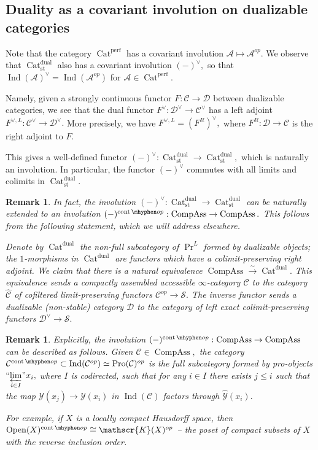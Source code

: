 \documentclass[11pt,leqno]{amsart}
\newtheorem{remark}[theo]{Remark}
\numberwithin{equation}{section}
\newcommand{\ms}[1]{\mathscr{#1}}
\newcommand{\msK}{\ms{K}}
\newcommand{\hy}{\mhyphen}
\newcommand{\prolim}[1][]{\mathop{\varprojlim}\limits_{#1}}
\newcommand{\proolim}[1][]{{``{\prolim[#1]}"}}
\newcommand{\xto}{\xrightarrow}
\newcommand{\Cat}{\operatorname{Cat}}
\newcommand{\cont}{\operatorname{cont}}
\newcommand{\st}{\operatorname{st}}
\newcommand{\dual}{\operatorname{dual}}
\newcommand{\cD}{{\mathcal D}}
\newcommand{\cA}{{\mathcal A}}
\newcommand{\cC}{{\mathcal C}}
\newcommand{\cY}{{\mathcal Y}}
\newcommand{\cS}{{\mathcal S}}
\newcommand{\Compass}{\operatorname{CompAss}}
\newcommand{\perf}{\operatorname{perf}}
\newcommand{\Ind}{\operatorname{Ind}}
\newcommand{\Pro}{\operatorname{Pro}}
\newcommand{\Open}{\operatorname{Open}}
\begin{document}
\subsection{Duality as a covariant involution on dualizable categories}
\label{ssec:duality_covariant}

Note that the category $\Cat^{\perf}$ has a covariant involution $\cA\mapsto\cA^{op}.$ We observe that $\Cat_{\st}^{\dual}$ also has a covariant involution $(-)^{\vee},$ so that $\Ind(\cA)^{\vee}=\Ind(\cA^{op})$ for $\cA\in\Cat^{\perf}.$

Namely, given a strongly continuous functor $F:\cC\to\cD$ between dualizable categories, we see that the dual functor $F^{\vee}:\cD^{\vee}\to\cC^{\vee}$ has a left adjoint $F^{\vee,L}:\cC^{\vee}\to\cD^{\vee}.$ More precisely, we have $F^{\vee,L}=(F^R)^{\vee},$ where $F^R:\cD\to\cC$ is the right adjoint to $F.$

This gives a well-defined functor $(-)^{\vee}:\Cat_{\st}^{\dual}\to \Cat_{\st}^{\dual},$ which is naturally an involution. In particular, the functor $(-)^{\vee}$ commutes with all limits and colimits in $\Cat_{\st}^{\dual}.$

\begin{remark}In fact, the involution $(-)^{\vee}:\Cat_{\st}^{\dual}\to \Cat_{\st}^{\dual}$ can be naturally extended to an involution $(-)^{\cont\hy op}:\Compass\to\Compass.$ This follows from the following statement, which we will address elsewhere.

Denote by $\Cat^{\dual}$ the non-full subcategory of $\Pr^L$ formed by dualizable objects; the $1$-morphisms in $\Cat^{\dual}$ are functors which have a colimit-preserving right adjoint. We claim that there is a natural equivalence $\Compass\xto{\sim}\Cat^{\dual}.$ This equivalence sends a compactly assembled accessible $\infty$-category $\cC$ to the category $\hat{\cC}$ of cofiltered limit-preserving functors $\cC^{op}\to\cS.$ The inverse functor sends a dualizable (non-stable) category $\cD$ to the category of left exact colimit-preserving functors $\cD^{\vee}\to\cS.$\end{remark}

\begin{remark} Explicitly, the involution $(-)^{\cont\hy op}:\Compass\to\Compass$ can be described as follows. Given $\cC\in\Compass,$ the category $\cC^{\cont\hy op}\subset\Ind(\cC^{op})\simeq\Pro(\cC)^{op}$ is the full subcategory formed by pro-objects $\proolim[i\in I]x_i,$ where $I$ is codirected, such that for any $i\in I$ there exists $j\leq i$ such that the map $\cY(x_j)\to\cY(x_i)$ in $\Ind(\cC)$ factors through $\hat{\cY}(x_i).$

For example, if $X$ is a locally compact Hausdorff space, then $\Open(X)^{\cont\hy op}\cong \msK(X)^{op}$ -- the poset of compact subsets of $X$ with the reverse inclusion order.\end{remark} 
\end{document}
